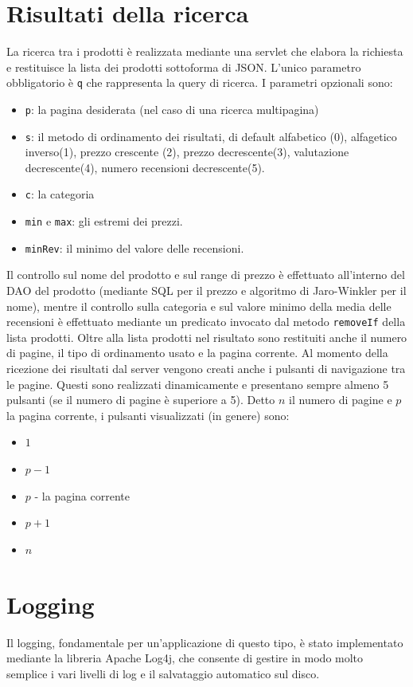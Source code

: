 \chapter{Risultati della ricerca}
La ricerca tra i prodotti è realizzata mediante una servlet che elabora la richiesta e restituisce la lista dei prodotti sottoforma di JSON. L'unico parametro obbligatorio è \texttt{q} che rappresenta la query di ricerca.
I parametri opzionali sono:
\begin{itemize}
  \item \texttt{p}: la pagina desiderata (nel caso di  una ricerca multipagina)
  \item \texttt{s}: il metodo di ordinamento dei risultati, di default alfabetico (0), alfagetico inverso(1), prezzo crescente (2), prezzo decrescente(3), valutazione decrescente(4),  numero recensioni decrescente(5).
  \item \texttt{c}: la categoria
  \item \texttt{min} e \texttt{max}: gli estremi dei prezzi.
  \item \texttt{minRev}: il minimo del valore delle recensioni.
\end{itemize}
Il controllo sul nome del prodotto e sul range di prezzo è effettuato all'interno del DAO del prodotto (mediante SQL per il prezzo e algoritmo di Jaro-Winkler per il nome), mentre il controllo sulla categoria e sul valore minimo della media delle recensioni è effettuato mediante un predicato invocato dal metodo \texttt{removeIf} della lista prodotti.
Oltre alla lista prodotti nel risultato sono restituiti anche il numero di pagine, il tipo di ordinamento usato e la pagina corrente. Al momento della ricezione dei risultati dal server vengono creati anche i pulsanti di navigazione tra le pagine. Questi sono realizzati dinamicamente e presentano sempre almeno 5 pulsanti (se il numero di pagine è superiore a 5). Detto $n$ il numero di pagine e $p$ la pagina corrente, i pulsanti visualizzati (in genere) sono:
\begin{itemize}
  \item $1$
  \item $p-1$
  \item $p$ - la pagina corrente
  \item $p+1$
  \item $n$
\end{itemize}


\chapter{Logging}
Il logging, fondamentale per un'applicazione di questo tipo, è stato implementato mediante la libreria Apache Log4j, che consente di gestire in modo molto semplice i vari livelli di log e il salvataggio automatico sul disco.

